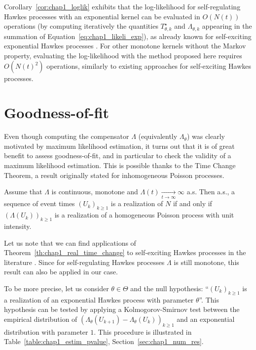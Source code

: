 Corollary~\ref{cor:chap1_loglik} exhibits that the log-likelihood for
self-regulating Hawkes processes with an exponential kernel can be evaluated in $O(N(t))$ operations (by computing iteratively the quantities $T_{\theta, k}^\star$ and $\Lambda_{\theta, k}$ appearing in the summation of Equation~\eqref{eq:chap1_likeli_exp}),
as already known
for self-exciting exponential Hawkes processes \cite[Chapter 4.2]{Laub2014}.
For other monotone kernels without the Markov property, evaluating the log-likelihood with the method proposed here requires $O(N(t)^2)$ operations, similarly to existing approaches for self-exciting Hawkes processes.

\section{Goodness-of-fit}
\label{sec:chap1_goodness}

Even though computing the compensator $\Lambda$ (equivalently $\Lambda_\theta$) was clearly motivated by maximum likelihood estimation, it turns out that it is of great benefit to assess goodness-of-fit, and in particular to check the validity of a maximum likelihood estimation.
This is possible thanks to the Time Change Theorem, a result originally stated for inhomogeneous Poisson processes.

\begin{theorem}\label{th:chap1_real_time_change}
  Assume that $\Lambda$ is continuous, monotone and $\Lambda(t)\xrightarrow[t\rightarrow \infty]{} \infty$ a.s.
  Then a.s., a sequence of event times $(U_k)_{k\ge 1}$ is a realization of $N$ if and only if $(\Lambda(U_k))_{k \ge 1}$ is a realization of a homogeneous Poisson process with unit intensity.
\end{theorem}

Let us note that we can find applications of Theorem~\ref{th:chap1_real_time_change} to self-exciting Hawkes processes in the literature \cite[Chapter 5]{Laub2014}.
Since for self-regulating Hawkes processes \(\Lambda\) is still monotone, this result can also be applied in our case.

To be more precise, let us consider \(\theta \in \Theta\) and the null hypothesis: ``$(U_k)_{k\ge 1}$ is a realization of an exponential Hawkes process with parameter \(\theta\)''.
This hypothesis can be tested by applying a Kolmogorov-Smirnov test between the empirical distribution of $\left( \Lambda_\theta(U_{k+1}) - \Lambda_\theta(U_k) \right)_{k \ge 1}$ and an exponential distribution with parameter \(1\).
This procedure is illustrated in Table~\ref{table:chap1_estim_pvalue}, Section~\ref{sec:chap1_num_res}.

